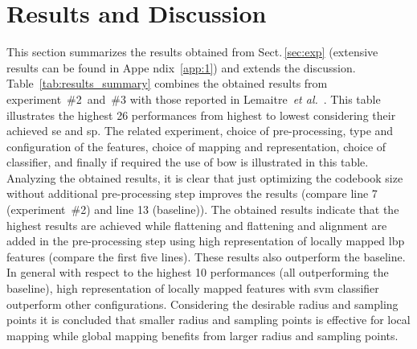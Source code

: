 
\section{Results and Discussion}
\label{sec:res-dis}
This section summarizes the results obtained from Sect.\,\ref{sec:exp} (extensive results can be found in Appe	ndix~\ref{app:1}) and extends the discussion.
Table~\ref{tab:results_summary} combines the obtained results from experiment~\#2~and~\#3 with those reported in Lemaitre~\emph{et al.}~\cite{Lemaintre2015miccaiOCT}.
This table illustrates the highest 26 performances from highest to lowest considering their achieved \ac{se} and \ac{sp}.
The related experiment, choice of pre-processing, type and configuration of the features, choice of mapping and representation, choice of classifier, and finally if required the use of \ac{bow} is illustrated in this table.
Analyzing the obtained results, it is clear that just optimizing the codebook size without additional pre-processing step improves the results (compare line 7 (experiment~\#2) and line 13 (baseline)).
The obtained results indicate that the highest results are achieved while flattening and flattening and alignment are added in the pre-processing step using high representation of locally mapped \ac{lbp} features (compare the first five lines).
These results also outperform the baseline.
In general with respect to the highest 10 performances (all outperforming the baseline), high representation of locally mapped features with \ac{svm} classifier outperform other configurations.
Considering the desirable radius and sampling points it is concluded that smaller radius and sampling points is effective for local mapping while global mapping benefits from larger radius and sampling points.
